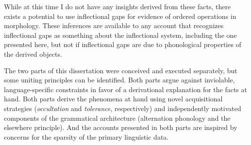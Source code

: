 While at this time I do not have any insights derived from these facts, there exists a potential to use inflectional gaps for evidence of ordered operations in morphology. These inferences are available to any account that recognizes inflectional gaps as something about the inflectional system, including the one presented here, but not if inflectional gaps are due to phonological properties of the derived objects.

The two parts of this dissertation were conceived and executed separately, but some uniting principles can be identified. Both parts argue against inviolable, language-specific constraints in favor of a derivational explanation for the facts at hand. Both parts derive the phenomena at hand using novel acquisitional strategies (\emph{occultation} and \emph{tolerance}, respectively) and independently motivated components of the grammatical architecture (alternation phonology and the elsewhere principle). And the accounts presented in both parts are inspired by concerns for the sparsity of the primary linguistic data.
